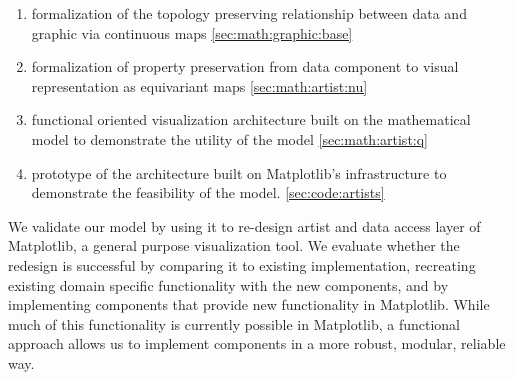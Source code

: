 \documentclass[../main.tex]{subfiles}
\begin{document}
\begin{enumerate}
  \item formalization of the topology preserving relationship between data and graphic via continuous maps \autoref{sec:math:graphic:base}
  \item formalization of property preservation from data component to visual representation as equivariant maps \autoref{sec:math:artist:nu}
  \item functional oriented visualization architecture built on the mathematical model to demonstrate the utility of the model \autoref{sec:math:artist:q}
  \item prototype of the architecture built on Matplotlib's infrastructure to demonstrate the feasibility of the model. \autoref{sec:code:artists}
\end{enumerate}
We validate our model by using it to re-design artist and data access layer of Matplotlib, a general purpose visualization tool. We evaluate whether the redesign is successful by comparing it to existing implementation, recreating existing domain specific functionality with the new components, and by implementing components that provide new functionality in Matplotlib. While much of this functionality is currently possible in Matplotlib, a functional approach allows us to implement components in a more robust, modular, reliable way.
\end{document}
